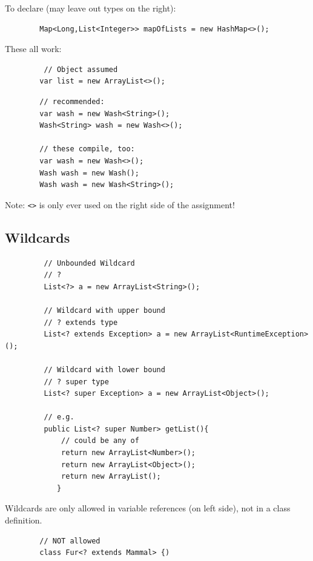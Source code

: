\documentclass{scrartcl}
\begin{document}
     To declare (may leave out types on the right):

    \begin{lstlisting}
        Map<Long,List<Integer>> mapOfLists = new HashMap<>();
    \end{lstlisting}

    These all work:

    \begin{lstlisting}
         // Object assumed
        var list = new ArrayList<>();
    \end{lstlisting}

    \begin{lstlisting}
        // recommended:
        var wash = new Wash<String>();
        Wash<String> wash = new Wash<>();

        // these compile, too:
        var wash = new Wash<>();
        Wash wash = new Wash();
        Wash wash = new Wash<String>();

    \end{lstlisting}

Note: \lstinline|<>| is only ever used on the right side of the assignment!

\subsection{Wildcards}

    \begin{lstlisting}
         // Unbounded Wildcard
         //	?
         List<?> a = new ArrayList<String>();

         // Wildcard with upper bound
         // ? extends type
         List<? extends Exception> a = new ArrayList<RuntimeException>();

         // Wildcard with lower bound
         //	? super type
         List<? super Exception> a = new ArrayList<Object>();

         // e.g.
         public List<? super Number> getList(){
             // could be any of
             return new ArrayList<Number>();
             return new ArrayList<Object>();
             return new ArrayList();
            }

    \end{lstlisting}

     Wildcards are only allowed in variable references (on left side), not in a class definition.

    \begin{lstlisting}
        // NOT allowed
        class Fur<? extends Mammal> {)
    \end{lstlisting}
\end{document}
